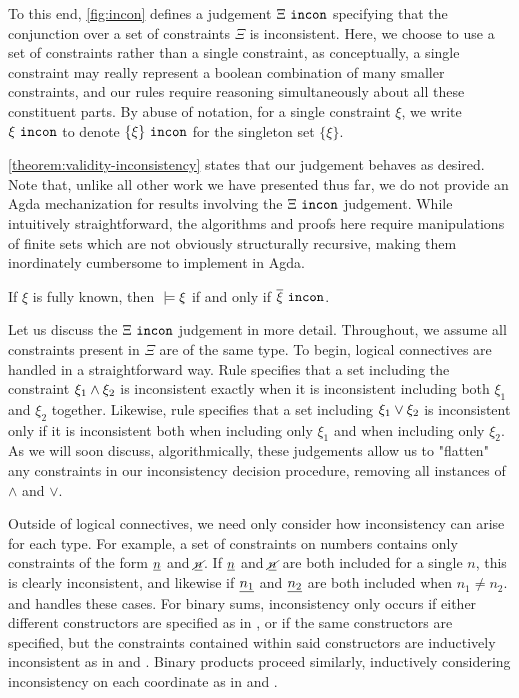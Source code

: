 

To this end, \autoref{fig:incon} defines a judgement  $\Xi ~\mathtt{incon}$ specifying that the conjunction over a set of constraints $\Xi$ is inconsistent. Here, we choose to use a set of constraints rather than a single constraint, as conceptually, a single constraint may really represent a boolean combination of many smaller constraints, and our rules require reasoning simultaneously about all these constituent parts. By abuse of notation, for a single constraint $\xi$, we write $\xi ~\mathtt{incon}$ to denote $\{\xi\} ~\mathtt{incon}$ for the singleton set $\{\xi\}$.

\autoref{theorem:validity-inconsistency} states that our judgement behaves as desired. Note that, unlike all other work we have presented thus far, we do not provide an Agda mechanization for results involving the $\Xi ~\mathtt{incon}$ judgement.  While intuitively straightforward, the algorithms and proofs here require manipulations of finite sets which are not obviously structurally recursive, making them inordinately cumbersome to implement in Agda.

\begin{theorem}
\label{theorem:validity-inconsistency}
If $\xi$ is fully known, then $\; \models \xi$ if and only if\; $\overline{\xi} ~\mathtt{incon}$.
\end{theorem}

Let us discuss the $\Xi ~\mathtt{incon}$ judgement in more detail. Throughout, we assume all constraints present in $\Xi$ are of the same type. To begin, logical connectives are handled in a straightforward way. Rule \CINCAnd specifies that a set including the constraint $\xi_1 \wedge \xi_2$ is inconsistent exactly when it is inconsistent including both $\xi_1$ and $\xi_2$ together. Likewise, rule \CINCOr specifies that a set including $\xi_1 \vee \xi_2$ is inconsistent only if it is inconsistent both when including only $\xi_1$ and when including only $\xi_2$. As we will soon discuss, algorithmically, these judgements allow us to "flatten" any constraints in our inconsistency decision procedure, removing all instances of $\land$ and $\lor$.

Outside of logical connectives, we need only consider how inconsistency can arise for each type. For example, a set of constraints on numbers contains only constraints of the form $\underline{n}$ and $\underline{\cancel{n}}$. If $\underline{n}$ and $\underline{\cancel{n}}$ are both included for a single $n$, this is clearly inconsistent, and likewise if $\underline{n_1}$ and $\underline{n_2}$ are both included when $n_1 \neq n_2$. \CINCNum and \CINCNotNum handles these cases. For binary sums, inconsistency only occurs if either different constructors are specified as in \CINCInj, or if the same constructors are specified, but the constraints contained within said constructors are inductively inconsistent as in \CINCInl and \CINCInr. Binary products proceed similarly, inductively considering inconsistency on each coordinate as in \CINCPairL and \CINCPairR.

